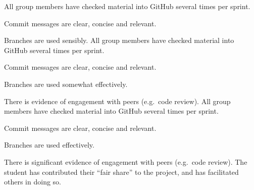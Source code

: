 \documentclass{../fal_assignment}
\begin{document}
\begin{markingrubric}
        \grade All group members have checked material into GitHub several times per sprint.
            \par Commit messages are clear, concise and relevant.
            \par Branches are used sensibly.
        \grade All group members have checked material into GitHub several times per sprint.
            \par Commit messages are clear, concise and relevant.
            \par Branches are used somewhat effectively.
            \par There is evidence of engagement with peers (e.g.\ code review).
        \grade All group members have checked material into GitHub several times per sprint.
            \par Commit messages are clear, concise and relevant.
            \par Branches are used effectively.
            \par There is significant evidence of engagement with peers (e.g.\ code review).
        \grade The student has contributed their ``fair share'' to the project,
            and has facilitated others in doing so.
\end{markingrubric}
\end{document}
